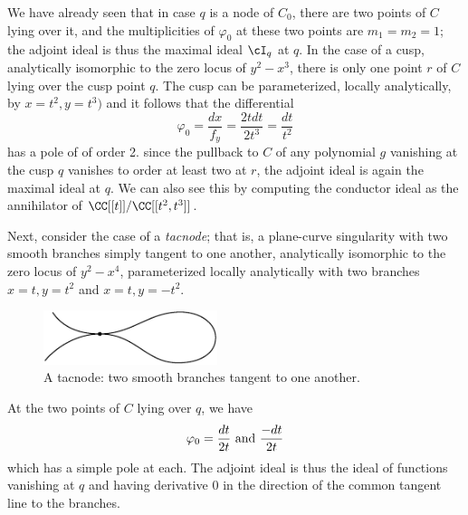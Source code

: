 


\begin{example}
We have already seen that in case $q$ is a node of $C_0$, there are two points of $C$ lying over it, and the multiplicities of $\varphi_0$ at these two points are $m_1=m_2=1$; the adjoint ideal is thus 
 the maximal ideal $\cI_q$ at $q$. In the case of a cusp, analytically isomorphic to the zero locus of $y^2-x^3$, there is only one point $r$ of $C$ lying over the cusp point $q$. The cusp can be parameterized, locally analytically,
 by $x = t^{2}, y = t^{3})$ and it follows that the differential 
 $$
 \varphi_0 = \frac{dx}{f_{y}} =  \frac{2tdt}{2t^{3}} =  \frac{dt}{t^{2}}
 $$ 
 has a pole of of order 2. since the pullback to $C$ of any polynomial $g$ vanishing at the cusp $q$ vanishes to order at least two at $r$, the adjoint ideal is again the maximal ideal at $q$. We can also see this by computing the
 conductor ideal as the annihilator of $\CC[[t]]/\CC[[t^{2}, t^{3}]]$.
\end{example}

\begin{example}[tacnodes]
Next, consider the case of a \emph{tacnode}; that is, a plane-curve singularity with two smooth branches simply tangent to one another, analytically isomorphic to the zero locus of $y^2-x^4$, parameterized locally analytically with two branches $x = t, y =  t^{2}$ and $x=t, y = -t^{2}$.

\begin{figure}
\centerline {\includegraphics[width=2in]{"main/Fig14-4"}}
\caption{A tacnode: two smooth branches tangent to one another.}
\label{Fig14.4}
\end{figure}

At the two points of $C$ lying over $q$, we have
  $$
 \varphi_0 =  \frac{dt}{ 2t} \hbox{ and } \frac{-dt}{ 2t}
 $$ 
which has a simple pole at each. 
The adjoint ideal is thus the ideal of functions vanishing at $q$ and having derivative 0 in the direction of the common tangent line to the branches.
\end{example}

